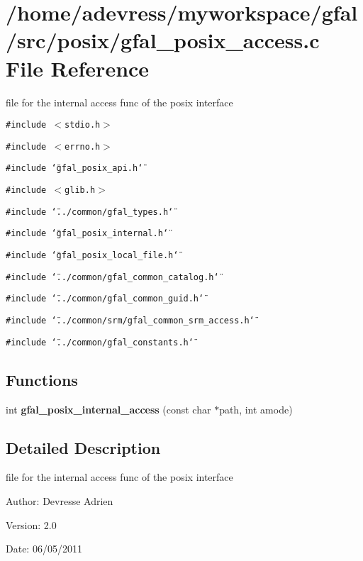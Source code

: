 \section{/home/adevress/myworkspace/gfal/src/posix/gfal\_\-posix\_\-access.c File Reference}
\label{gfal__posix__access_8c}
file for the internal access func of the posix interface 

{\tt \#include $<$stdio.h$>$}\par
{\tt \#include $<$errno.h$>$}\par
{\tt \#include \char`\"{}gfal\_\-posix\_\-api.h\char`\"{}}\par
{\tt \#include $<$glib.h$>$}\par
{\tt \#include \char`\"{}../common/gfal\_\-types.h\char`\"{}}\par
{\tt \#include \char`\"{}gfal\_\-posix\_\-internal.h\char`\"{}}\par
{\tt \#include \char`\"{}gfal\_\-posix\_\-local\_\-file.h\char`\"{}}\par
{\tt \#include \char`\"{}../common/gfal\_\-common\_\-catalog.h\char`\"{}}\par
{\tt \#include \char`\"{}../common/gfal\_\-common\_\-guid.h\char`\"{}}\par
{\tt \#include \char`\"{}../common/srm/gfal\_\-common\_\-srm\_\-access.h\char`\"{}}\par
{\tt \#include \char`\"{}../common/gfal\_\-constants.h\char`\"{}}\par
\subsection*{Functions}
\begin{CompactItemize}
\item 
int \textbf{gfal\_\-posix\_\-internal\_\-access} (const char $\ast$path, int amode)\label{gfal__posix__access_8c_4dd88ccfb2942d117604793819e1f933}

\end{CompactItemize}


\subsection{Detailed Description}
file for the internal access func of the posix interface 

\begin{Desc}
\item[Author:]Devresse Adrien \end{Desc}
\begin{Desc}
\item[Version:]2.0 \end{Desc}
\begin{Desc}
\item[Date:]06/05/2011 \end{Desc}
